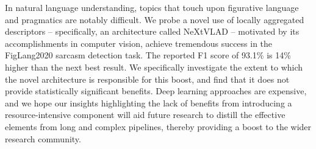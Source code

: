 In natural language understanding, topics that touch upon figurative language and pragmatics are notably difficult. We probe a novel use of locally aggregated descriptors -- specifically, an architecture called NeXtVLAD -- motivated by its accomplishments in computer vision, achieve tremendous success in the FigLang2020 sarcasm detection task. The reported F1 score of 93.1\% is 14\% higher than the next best result. We specifically investigate the extent to which the novel architecture is responsible for this boost, and find that it does not provide statistically significant benefits. Deep learning approaches are expensive, and we hope our insights highlighting the lack of benefits from introducing a resource-intensive component will aid future research to distill the effective elements from long and complex pipelines, thereby providing a boost to the wider research community.
